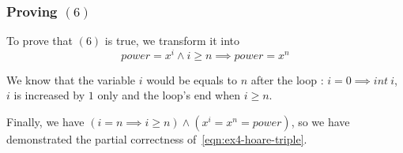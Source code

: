 \documentclass[a4paper,11pt]{report}
\begin{document}
\subsubsection*{Proving $(6)$}

To prove that $(6)$ is true, we transform it into
\[
  power = x^i \wedge i \geq n \implies power = x^n
\]

We know that the variable $i$ would be equals to $n$ after the loop : $i = 0
\implies int\ i$, $i$ is increased by $1$ only and the loop's end when $i \geq
n$.

Finally, we have $(i = n \implies i \geq n) \wedge (x^i = x^n = power)$, so we
have demonstrated the partial correctness of~\eqref{eqn:ex4-hoare-triple}.
\end{document}
